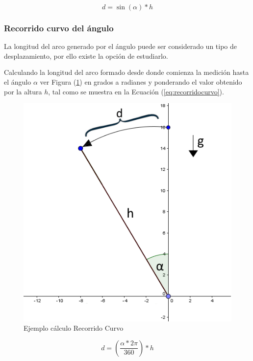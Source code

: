 \documentclass[12pt,a4paper]{article}
\begin{document}
\begin{equation}
	\label{eq:proyeccion}
	d=\sin(\alpha)*h
\end{equation}


\subsubsection{Recorrido curvo del ángulo}
La longitud del arco generado por el ángulo puede ser considerado un tipo de desplazamiento, por ello existe la opción de estudiarlo.

Calculando la longitud del arco formado desde donde comienza la medición hasta el ángulo $\alpha$ ver Figura (\ref{fig:recorridocurvo}) en grados a radianes y ponderando el valor obtenido por la altura $h$, tal como se muestra en la Ecuación (\ref{eq:recorridocurvo}).

\begin{figure}[H]
	\centering
	\includegraphics[scale=0.6]{images/calculoRecorridoCurvo}
	\caption{Ejemplo cálculo Recorrido Curvo}
	\label{fig:recorridocurvo}
\end{figure}

\begin{equation}
	\label{eq:recorridocurvo}
	d=\left(\frac{\alpha*2\pi}{360}\right)*h
\end{equation}
\end{document}
